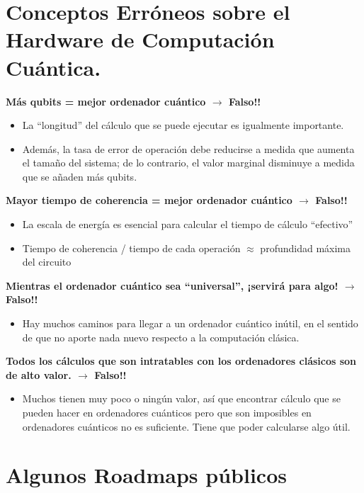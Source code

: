 \section{Conceptos Erróneos sobre el Hardware de Computación Cuántica.}


\textbf{Más qubits = mejor ordenador cuántico $\rightarrow$ Falso!!}
\begin{itemize}
\item La ``longitud'' del cálculo que se puede ejecutar es igualmente importante.
\item Además, la tasa de error de operación debe reducirse a medida que aumenta el tamaño del sistema; de lo contrario, el valor marginal disminuye a medida que se añaden más qubits.
\end{itemize}

\textbf{Mayor tiempo de coherencia = mejor ordenador cuántico $\rightarrow$ Falso!!}
\begin{itemize}
	\item La escala de energía es esencial para calcular el tiempo de cálculo ``efectivo''
	\item Tiempo de coherencia / tiempo de cada operación $\approx$ profundidad máxima del circuito
\end{itemize}

\textbf{Mientras el ordenador cuántico sea ``universal'', ¡servirá para algo! $\rightarrow$ Falso!!}
\begin{itemize}
\item  Hay muchos caminos para llegar a un ordenador cuántico inútil, en el sentido de que no aporte nada nuevo respecto a la computación clásica.
\end{itemize}

\textbf{Todos los cálculos que son intratables con los ordenadores clásicos son de alto valor. $\rightarrow$ Falso!!}
\begin{itemize}
\item Muchos tienen muy poco o ningún valor, así que encontrar cálculo que se pueden hacer en ordenadores cuánticos pero que son imposibles en ordenadores cuánticos no es suficiente. Tiene que poder calcularse algo útil.
\end{itemize}





\section{Algunos Roadmaps públicos}

